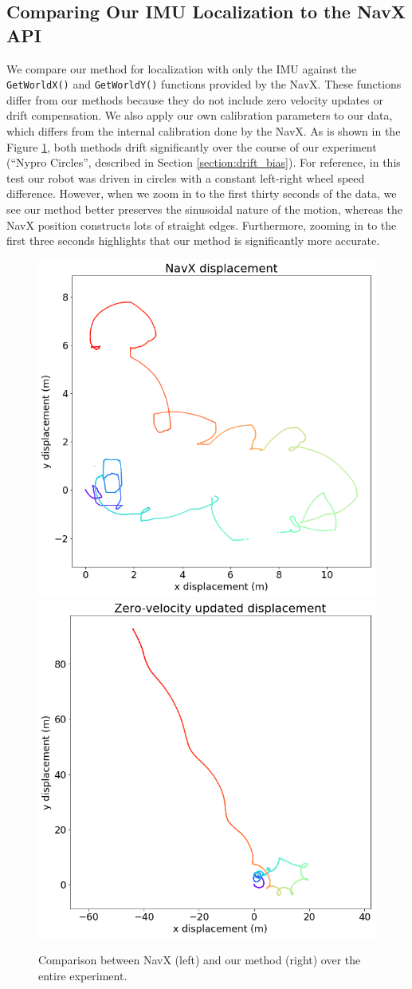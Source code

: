 \documentclass{article}
\begin{document}
  \subsection{Comparing Our IMU Localization to the NavX API}

		We compare our method for localization with only the IMU against the \texttt{GetWorldX()} and \texttt{GetWorldY()} functions provided by the NavX. These functions differ from our methods because they do not include zero velocity updates or drift compensation. We also apply our own calibration parameters to our data, which differs from the internal calibration done by the NavX. As is shown in the Figure \ref{fig:displacement_comparison}, both methods drift significantly over the course of our experiment (``Nypro Circles'', described in Section \ref{section:drift_bias}). For reference, in this test our robot was driven in circles with a constant left-right wheel speed difference. However, when we zoom in to the first thirty seconds of the data, we see our method better preserves the sinusoidal nature of the motion, whereas the NavX position constructs lots of straight edges. Furthermore, zooming in to the first three seconds highlights that our method is significantly more accurate.

		\begin{figure}[H]
			\centering
			\includegraphics[width=0.49\linewidth]{./images/navx-displacement.png}
			\includegraphics[width=0.49\linewidth]{./images/zeroed-displacement.png}
			\caption{Comparison between NavX (left) and our method (right) over the entire experiment.}
			\label{fig:displacement_comparison}
		\end{figure}
\end{document}
